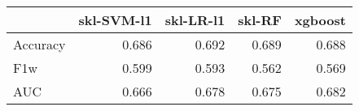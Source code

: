 \begin{tabular}{lrrrr}
\toprule
{} &  skl-SVM-l1 &  skl-LR-l1 &  skl-RF &  xgboost \\
\midrule
Accuracy &       0.686 &      0.692 &   0.689 &    0.688 \\
F1w      &       0.599 &      0.593 &   0.562 &    0.569 \\
AUC      &       0.666 &      0.678 &   0.675 &    0.682 \\
\bottomrule
\end{tabular}
